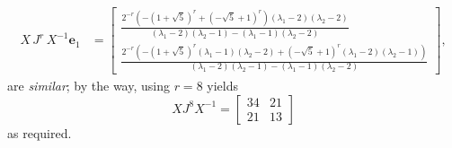 \begin{example}
\begin{displaymath}
\begin{split}
X\,J^{r}\,X^{-1}\boldsymbol{e}_{1}  &= \left[\begin{matrix}\frac{2^{- r} \left(- \left(1 + \sqrt{5}\right)^{r} + \left(- \sqrt{5} + 1\right)^{r}\right) \left(\lambda_{1} - 2\right) \left(\lambda_{2} - 2\right)}{\left(\lambda_{1} - 2\right) \left(\lambda_{2} - 1\right) - \left(\lambda_{1} - 1\right) \left(\lambda_{2} - 2\right)}\\\frac{2^{- r} \left(- \left(1 + \sqrt{5}\right)^{r} \left(\lambda_{1} - 1\right) \left(\lambda_{2} - 2\right) + \left(- \sqrt{5} + 1\right)^{r} \left(\lambda_{1} - 2\right) \left(\lambda_{2} - 1\right)\right)}{\left(\lambda_{1} - 2\right) \left(\lambda_{2} - 1\right) - \left(\lambda_{1} - 1\right) \left(\lambda_{2} - 2\right)}\end{matrix}\right],
\end{split}
\end{displaymath}
are \textit{similar}; by the way, using $r=8$ yields
\begin{displaymath}
X J^{8} X^{-1} = \left[\begin{matrix}34 & 21\\21 & 13\end{matrix}\right]
\end{displaymath}
as required.
\end{example}
